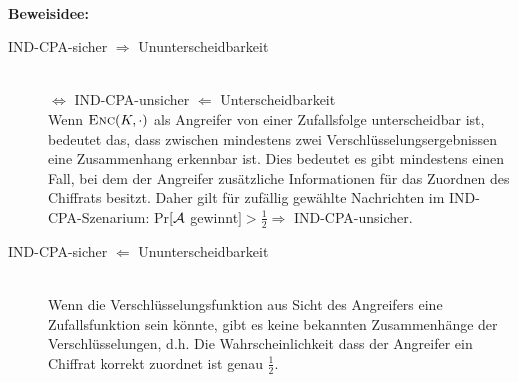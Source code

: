 ~\\
\textbf{Beweisidee:}
    \begin{description}
	   \item[IND-CPA-sicher $\Rightarrow$ Ununterscheidbarkeit]~\\
		  $\Leftrightarrow$ IND-CPA-unsicher $\Leftarrow$ Unterscheidbarkeit~\\
		  Wenn $\textsc{Enc}(K, \cdot)$ als Angreifer von einer Zufallsfolge unterscheidbar ist, bedeutet das, dass zwischen mindestens zwei Verschlüsselungsergebnissen
		eine Zusammenhang erkennbar ist. Dies bedeutet es gibt mindestens einen Fall, bei dem der Angreifer zusätzliche Informationen für das Zuordnen des Chiffrats besitzt. Daher gilt für zufällig gewählte Nachrichten im IND-CPA-Szenarium: Pr$[\mathcal{A}$ gewinnt$] > \frac{1}{2} \Rightarrow$ IND-CPA-unsicher.
	   \item[IND-CPA-sicher $\Leftarrow$ Ununterscheidbarkeit]~\\
		  Wenn die Verschlüsselungsfunktion aus Sicht des Angreifers eine Zufallsfunktion sein könnte, gibt es keine bekannten Zusammenhänge der Verschlüsselungen,
		d.h. Die Wahrscheinlichkeit dass der Angreifer ein Chiffrat korrekt zuordnet ist genau $\frac{1}{2}$.
    \end{description}

~\\
~\\

